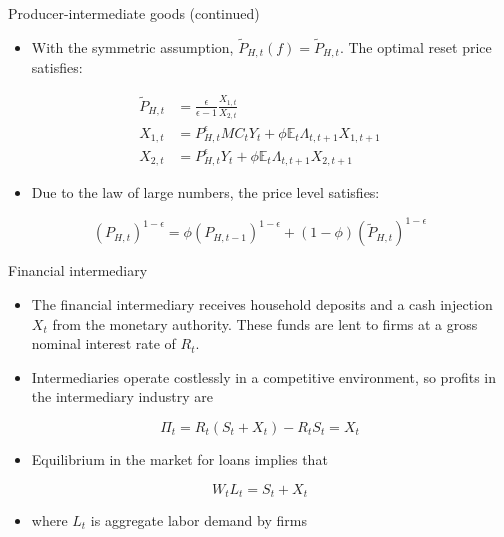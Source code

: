 \documentclass[10pt]{beamer}
\begin{document}
\begin{frame}{Producer-intermediate goods (continued)}

\begin{itemize}
    \item With the symmetric assumption, $\tilde{P}_{H, t}(f)=\tilde{P}_{H, t}$. The optimal reset price satisfies:
\end{itemize}


$$
\begin{aligned}
\tilde{P}_{H, t} & =\frac{\epsilon}{\epsilon-1} \frac{X_{1, t}}{X_{2, t}} \\
X_{1, t} & =P_{H, t}^{\epsilon} M C_{t} Y_{t}+\phi \mathbb{E}_{t} \Lambda_{t, t+1} X_{1, t+1} \\
X_{2, t} & =P_{H, t}^{\epsilon} Y_{t}+\phi \mathbb{E}_{t} \Lambda_{t, t+1} X_{2, t+1}
\end{aligned}
$$

\begin{itemize}
    \item Due to the law of large numbers, the price level satisfies:
\end{itemize}

$$
\left(P_{H, t}\right)^{1-\epsilon}=\phi\left(P_{H, t-1}\right)^{1-\epsilon}+(1-\phi)\left(\tilde{P}_{H, t}\right)^{1-\epsilon}
$$

\end{frame}

\begin{frame}{Financial intermediary}
    
\begin{itemize}
    \item The financial intermediary receives household deposits and a cash injection $X_t$ from the monetary authority. These funds are lent to firms at a gross nominal interest rate of $R_t$.
\end{itemize}

\begin{itemize}
    \item  Intermediaries operate costlessly in a competitive environment, so profits in the intermediary industry are 
\end{itemize}

$$
\Pi_t=R_t(S_t+X_t)-R_tS_t=X_t
$$

\begin{itemize}
    \item Equilibrium in the market for loans implies that 
\end{itemize}

$$
W_tL_t=S_t+X_t
$$ 

\begin{itemize}
    \item where $L_t$ is aggregate labor demand by firms
\end{itemize}


\end{frame}
\end{document}
